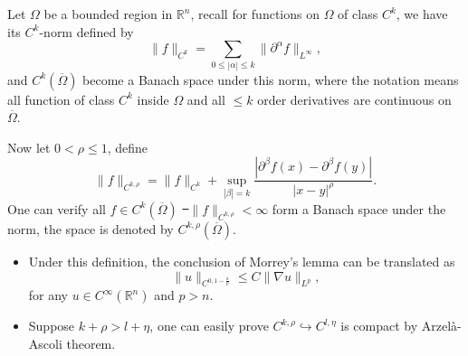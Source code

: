 \documentclass[UTF8,12pt]{article}
\numberwithin{theorem}{section}
\numberwithin{equation}{section}
\begin{document}
\begin{definition}
    Let \(\Omega\) be a bounded region in \(\mathbb{R}^n\), recall for functions on
    \(\Omega\) of class \(C^k\), we have its \(C^k\)-norm defined by \[
        \|f\|_{C^k}=\sum_{0\le |\alpha|\le k}\|\partial^\alpha f\|_{L^\infty},
    \] and \(C^k(\overline{\Omega})\) become a Banach space under this norm, where
    the notation means all function of class \(C^k\) inside \(\Omega\) and all
    \(\le k\) order derivatives are continuous on \(\overline{\Omega}\).

    Now let \(0<\rho\le 1\), define \[
        \|f\|_{C^{k,\rho}}=\|f\|_{C^k}+\sup_{|\beta|=k}
        \frac{|\partial^\beta f(x)-\partial^\beta f(y)|}{|x-y|^{\rho}}
    .\] One can verify all \(f\in C^k(\overline{\Omega})\) \st\ 
    \(\|f\|_{C^{k,\rho}}<\infty\) form a Banach space under the norm, the space is
    denoted by \(C^{k,\rho}(\overline{\Omega})\).
\end{definition}
\begin{remark}\hfill
\begin{itemize}
    \item 
    Under this definition, the conclusion of Morrey's lemma can be translated as
    \[
        \|u\|_{C^{0,1-\frac{n}{p}}}\le C\|\nabla u\|_{L^p},
    \] for any \(u\in C^\infty(\mathbb{R}^n)\) and \(p>n\).
    \item 
    Suppose \(k+\rho>l+\eta\), one can easily prove \(C^{k,\rho}\hookrightarrow
    C^{l,\eta}\) is compact by Arzelà-Ascoli theorem.
\end{itemize}
\end{remark}
\end{document}

